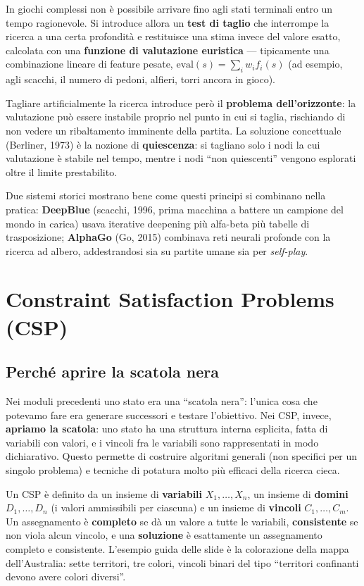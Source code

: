 \documentclass[11pt,a4paper]{article}
\begin{document}
In giochi complessi non è possibile arrivare fino agli stati terminali entro un tempo ragionevole. Si introduce allora un \textbf{test di taglio} che interrompe la ricerca a una certa profondità e restituisce una stima invece del valore esatto, calcolata con una \textbf{funzione di valutazione euristica} --- tipicamente una combinazione lineare di feature pesate, $\text{eval}(s) = \sum_i w_i f_i(s)$ (ad esempio, agli scacchi, il numero di pedoni, alfieri, torri ancora in gioco).

Tagliare artificialmente la ricerca introduce però il \textbf{problema dell'orizzonte}: la valutazione può essere instabile proprio nel punto in cui si taglia, rischiando di non vedere un ribaltamento imminente della partita. La soluzione concettuale (Berliner, 1973) è la nozione di \textbf{quiescenza}: si tagliano solo i nodi la cui valutazione è stabile nel tempo, mentre i nodi ``non quiescenti'' vengono esplorati oltre il limite prestabilito.

Due sistemi storici mostrano bene come questi principi si combinano nella pratica: \textbf{DeepBlue} (scacchi, 1996, prima macchina a battere un campione del mondo in carica) usava iterative deepening più alfa-beta più tabelle di trasposizione; \textbf{AlphaGo} (Go, 2015) combinava reti neurali profonde con la ricerca ad albero, addestrandosi sia su partite umane sia per \emph{self-play}.

\newpage
\section{Constraint Satisfaction Problems (CSP)}

\subsection{Perché aprire la scatola nera}

Nei moduli precedenti uno stato era una ``scatola nera'': l'unica cosa che potevamo fare era generare successori e testare l'obiettivo. Nei CSP, invece, \textbf{apriamo la scatola}: uno stato ha una struttura interna esplicita, fatta di variabili con valori, e i vincoli fra le variabili sono rappresentati in modo dichiarativo. Questo permette di costruire algoritmi generali (non specifici per un singolo problema) e tecniche di potatura molto più efficaci della ricerca cieca.

Un CSP è definito da un insieme di \textbf{variabili} $X_1,\dots,X_n$, un insieme di \textbf{domini} $D_1,\dots,D_n$ (i valori ammissibili per ciascuna) e un insieme di \textbf{vincoli} $C_1,\dots,C_m$. Un assegnamento è \textbf{completo} se dà un valore a tutte le variabili, \textbf{consistente} se non viola alcun vincolo, e una \textbf{soluzione} è esattamente un assegnamento completo e consistente. L'esempio guida delle slide è la colorazione della mappa dell'Australia: sette territori, tre colori, vincoli binari del tipo ``territori confinanti devono avere colori diversi''.
\end{document}
